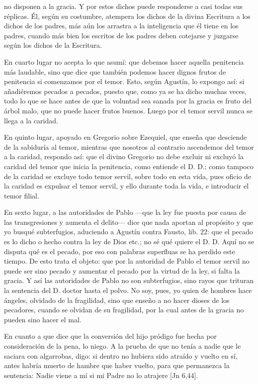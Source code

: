 no disponen a la gracia. Y por estos dichos puede responderse a casi todas sus réplicas. Él, según su costumbre, atempera los dichos de la divina Escritura a los dichos de los padres, más aún los arrastra a la inteligencia que él tiene en los padres, cuando más bien los escritos de los padres deben cotejarse y juzgarse según los dichos de la Escritura.

En cuarto lugar no acepta lo que asumí: que debemos hacer aquella penitencia más laudable, sino que dice que también podemos hacer dignos frutos de penitencia si comenzamos por el temor. Esto, según Agustín, lo expongo así: si añadiéremos pecados a pecados, puesto que, como ya se ha dicho muchas veces, todo lo que se hace antes de que la voluntad sea sanada por la gracia es fruto del árbol malo, que no puede hacer frutos buenos. Luego por el temor servil nunca se llega a la caridad.

En quinto lugar, apoyado en Gregorio sobre Ezequiel, que enseña que desciende de la sabiduría al temor, mientras que nosotros al contrario ascendemos del temor a la caridad, respondo así: que el divino Gregorio no debe excluir ni excluyó la caridad del temor que inicia la penitencia, como entiende el D. D.; como tampoco de la caridad se excluye todo temor servil, sobre todo en esta vida, pues oficio de la caridad es expulsar el temor servil, y ello durante toda la vida, e introducir el temor filial.

En sexto lugar, a las autoridades de Pablo —que la ley fue puesta por causa de las transgresiones y aumenta el delito— dice que nada aportan al propósito y que yo busqué subterfugios, aduciendo a Agustín contra Fausto, lib. 22: que el pecado es lo dicho o hecho contra la ley de Dios etc.; no sé qué quiere el D. D. Aquí no se disputa qué es el pecado, por eso con palabras superfluas se ha perdido este tiempo. De esto trata el objeto: que por la autoridad de Pablo el temor servil no puede ser sino pecado y aumentar el pecado por la virtud de la ley, si falta la gracia. Y así las autoridades de Pablo no son subterfugios, sino rayos que trituran la sentencia del D. doctor hasta el polvo. No soy, pues, yo quien de hombres hace ángeles, olvidado de la fragilidad, sino que enseño a no hacer dioses de los pecadores, cuando se olvidan de su fragilidad, por la cual antes de la gracia no pueden sino hacer el mal.

En cuanto a que dice que la conversión del hijo pródigo fue hecha por consideración de la pena, lo niego. A la prueba de que no tenía a nadie que le saciara con algarrobas, digo: si dentro no hubiera sido atraído y vuelto en sí, antes habría muerto de hambre que haber vuelto, para que permanezca la sentencia: Nadie viene a mí si mi Padre no lo atrajere [Jn 6,44].

